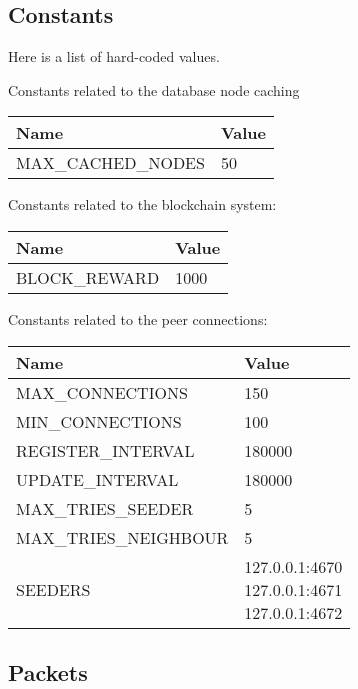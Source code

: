 \documentclass[../documentation.tex]{subfiles}
\begin{document}
\pagebreak

\hypertarget{constants}{}
\subsection{Constants}

Here is a list of hard-coded values.

Constants related to the database node caching

\bgroup{}
\def\arraystretch{1.25}
\begin{tabular}{|l|l|}
    \hline
    \textbf{Name} & \textbf{Value}
    \\ \hline
    MAX\_CACHED\_NODES & 50
    \\ \hline
\end{tabular}
\egroup{}

Constants related to the blockchain system:

\bgroup{}
\def\arraystretch{1.25}
\begin{tabular}{|l|l|}
    \hline
    \textbf{Name} & \textbf{Value}
    \\ \hline
    BLOCK\_REWARD & 1000
    \\ \hline
\end{tabular}
\egroup{}

Constants related to the peer connections:

\bgroup{}
\def\arraystretch{1.25}
\begin{tabular}{|l|l|}
    \hline
    \textbf{Name} & \textbf{Value}
    \\ \hline
    MAX\_CONNECTIONS & 150
    \\ \hline
    MIN\_CONNECTIONS & 100
    \\ \hline
    REGISTER\_INTERVAL & 180000
    \\ \hline
    UPDATE\_INTERVAL & 180000
    \\ \hline
    MAX\_TRIES\_SEEDER & 5
    \\ \hline
    MAX\_TRIES\_NEIGHBOUR & 5
    \\ \hline
    SEEDERS & \makecell[t] {
        127.0.0.1:4670 \\
        127.0.0.1:4671 \\
        127.0.0.1:4672
    }
    \\ \hline
\end{tabular}
\egroup{}

\hypertarget{packets}{}
\subsection{Packets}
\end{document}
